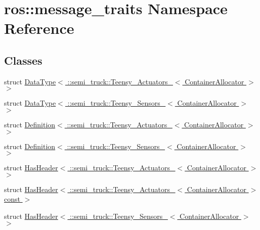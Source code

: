\hypertarget{namespaceros_1_1message__traits}{}\section{ros\+:\+:message\+\_\+traits Namespace Reference}
\label{namespaceros_1_1message__traits}
\subsection*{Classes}
\begin{DoxyCompactItemize}
\item 
struct \hyperlink{structros_1_1message__traits_1_1_data_type_3_01_1_1semi__truck_1_1_teensy___actuators___3_01_container_allocator_01_4_01_4}{Data\+Type$<$ \+::semi\+\_\+truck\+::\+Teensy\+\_\+\+Actuators\+\_\+$<$ Container\+Allocator $>$ $>$}
\item 
struct \hyperlink{structros_1_1message__traits_1_1_data_type_3_01_1_1semi__truck_1_1_teensy___sensors___3_01_container_allocator_01_4_01_4}{Data\+Type$<$ \+::semi\+\_\+truck\+::\+Teensy\+\_\+\+Sensors\+\_\+$<$ Container\+Allocator $>$ $>$}
\item 
struct \hyperlink{structros_1_1message__traits_1_1_definition_3_01_1_1semi__truck_1_1_teensy___actuators___3_01_container_allocator_01_4_01_4}{Definition$<$ \+::semi\+\_\+truck\+::\+Teensy\+\_\+\+Actuators\+\_\+$<$ Container\+Allocator $>$ $>$}
\item 
struct \hyperlink{structros_1_1message__traits_1_1_definition_3_01_1_1semi__truck_1_1_teensy___sensors___3_01_container_allocator_01_4_01_4}{Definition$<$ \+::semi\+\_\+truck\+::\+Teensy\+\_\+\+Sensors\+\_\+$<$ Container\+Allocator $>$ $>$}
\item 
struct \hyperlink{structros_1_1message__traits_1_1_has_header_3_01_1_1semi__truck_1_1_teensy___actuators___3_01_container_allocator_01_4_01_4}{Has\+Header$<$ \+::semi\+\_\+truck\+::\+Teensy\+\_\+\+Actuators\+\_\+$<$ Container\+Allocator $>$ $>$}
\item 
struct \hyperlink{structros_1_1message__traits_1_1_has_header_3_01_1_1semi__truck_1_1_teensy___actuators___3_01_coe86513e6694fc989720644eb04b2c486}{Has\+Header$<$ \+::semi\+\_\+truck\+::\+Teensy\+\_\+\+Actuators\+\_\+$<$ Container\+Allocator $>$ const  $>$}
\item 
struct \hyperlink{structros_1_1message__traits_1_1_has_header_3_01_1_1semi__truck_1_1_teensy___sensors___3_01_container_allocator_01_4_01_4}{Has\+Header$<$ \+::semi\+\_\+truck\+::\+Teensy\+\_\+\+Sensors\+\_\+$<$ Container\+Allocator $>$ $>$}

\end{DoxyCompactItemize}
